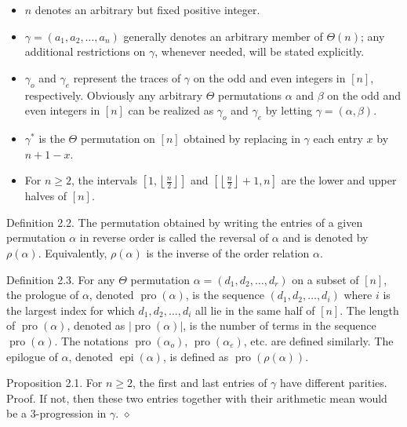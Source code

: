 \documentclass[10pt]{article}
\newcommand{\proofend}{\hfill\(\diamond\)}
\begin{document}
\begin{itemize}
  \item[(i)] $n$ denotes an arbitrary but fixed positive integer.
  \item[(ii)] $\gamma=\left(a_{1}, a_{2}, \ldots, a_{n}\right)$ generally denotes an arbitrary member of $\Theta(n)$; any additional restrictions on $\gamma$, whenever needed, will be stated explicitly.
  \item[(iii)] $\gamma_{o}$ and $\gamma_{e}$ represent the traces of $\gamma$ on the odd and even integers in $[n]$, respectively. Obviously any arbitrary $\Theta$ permutations $\alpha$ and $\beta$ on the odd and even integers in $[n]$ can be realized as $\gamma_{o}$ and $\gamma_{e}$ by letting $\gamma=(\alpha, \beta)$.
  \item[(iv)] $\gamma^{*}$ is the $\Theta$ permutation on $[n]$ obtained by replacing in $\gamma$ each entry $x$ by $n+1-x$.
  \item[(v)] For $n \geq 2$, the intervals $\left[1,\left\lfloor\frac{n}{2}\right\rfloor\right]$ and $\left[\left\lfloor\frac{n}{2}\right\rfloor+1, n\right]$ are the lower and upper halves of $[n]$.
\end{itemize}

Definition 2.2. The permutation obtained by writing the entries of a given permutation $\alpha$ in reverse order is called the reversal of $\alpha$ and is denoted by $\rho(\alpha)$. Equivalently, $\rho(\alpha)$ is the inverse of the order relation $\alpha$.

Definition 2.3. For any $\Theta$ permutation $\alpha=\left(d_{1}, d_{2}, \ldots, d_{r}\right)$ on a subset of $[n]$, the prologue of $\alpha$, denoted $\operatorname{pro}(\alpha)$, is the sequence $\left(d_{1}, d_{2}, \ldots, d_{i}\right)$ where $i$ is the largest index for which $d_{1}, d_{2}, \ldots, d_{i}$ all lie in the same half of $[n]$. The length of $\operatorname{pro}(\alpha)$, denoted as $|\operatorname{pro}(\alpha)|$, is the number of terms in the sequence $\operatorname{pro}(\alpha)$. The notations $\operatorname{pro}\left(\alpha_{o}\right)$, $\operatorname{pro}\left(\alpha_{e}\right)$, etc. are defined similarly. The epilogue of $\alpha$, denoted $\operatorname{epi}(\alpha)$, is defined as $\operatorname{pro}(\rho(\alpha))$.

Proposition 2.1. For $n \geq 2$, the first and last entries of $\gamma$ have different parities.\\
Proof. If not, then these two entries together with their arithmetic mean would be a 3-progression in $\gamma$. \proofend
\end{document}
